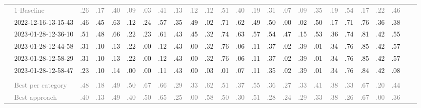 \begin{table*}
\begin{tabular}{@{}ll@{\hspace{10pt}}c@{\hspace{5pt}}cccccccccccccccccccccc@{}}
& \textcolor{gray}{1-Baseline} & \textcolor{gray}{.26} & \textcolor{gray}{.17} & \textcolor{gray}{.40} & \textcolor{gray}{.09} & \textcolor{gray}{.03} & \textcolor{gray}{.41} & \textcolor{gray}{.13} & \textcolor{gray}{.12} & \textcolor{gray}{.12} & \textcolor{gray}{.51} & \textcolor{gray}{.40} & \textcolor{gray}{.19} & \textcolor{gray}{.31} & \textcolor{gray}{.07} & \textcolor{gray}{.09} & \textcolor{gray}{.35} & \textcolor{gray}{.19} & \textcolor{gray}{.54} & \textcolor{gray}{.17} & \textcolor{gray}{.22} & \textcolor{gray}{.46} \\
& 2022-12-16-13-15-43 & .46 & .45 & .63 & .12 & .24 & .57 & .35 & .49 & .02 & .71 & .62 & .49 & .50 & .00 & .02 & .50 & .17 & .71 & .76 & .36 & .38 \\
& 2023-01-28-12-36-10 & .51 & .48 & .66 & .22 & .23 & .61 & .43 & .45 & .32 & .74 & .63 & .57 & .54 & .47 & .15 & .53 & .36 & .74 & .81 & .42 & .55 \\
& 2023-01-28-12-44-58 & .31 & .10 & .13 & .22 & .00 & .12 & .43 & .00 & .32 & .76 & .06 & .11 & .37 & .02 & .39 & .01 & .34 & .76 & .85 & .42 & .57 \\
& 2023-01-28-12-58-29 & .31 & .10 & .13 & .22 & .00 & .12 & .43 & .00 & .32 & .76 & .06 & .11 & .37 & .02 & .39 & .01 & .34 & .76 & .85 & .42 & .57 \\
& 2023-01-28-12-58-47 & .23 & .10 & .14 & .00 & .00 & .11 & .43 & .00 & .03 & .01 & .07 & .11 & .35 & .02 & .39 & .01 & .34 & .76 & .84 & .42 & .08 \\
\addlinespace
\multicolumn{2}{@{}l}{\emph{Nahj al-Balagha}} \\
& \textcolor{gray}{Best per category} & \textcolor{gray}{.48} & \textcolor{gray}{.18} & \textcolor{gray}{.49} & \textcolor{gray}{.50} & \textcolor{gray}{.67} & \textcolor{gray}{.66} & \textcolor{gray}{.29} & \textcolor{gray}{.33} & \textcolor{gray}{.62} & \textcolor{gray}{.51} & \textcolor{gray}{.37} & \textcolor{gray}{.55} & \textcolor{gray}{.36} & \textcolor{gray}{.27} & \textcolor{gray}{.33} & \textcolor{gray}{.41} & \textcolor{gray}{.38} & \textcolor{gray}{.33} & \textcolor{gray}{.67} & \textcolor{gray}{.20} & \textcolor{gray}{.44} \\
& \textcolor{gray}{Best approach} & \textcolor{gray}{.40} & \textcolor{gray}{.13} & \textcolor{gray}{.49} & \textcolor{gray}{.40} & \textcolor{gray}{.50} & \textcolor{gray}{.65} & \textcolor{gray}{.25} & \textcolor{gray}{.00} & \textcolor{gray}{.58} & \textcolor{gray}{.50} & \textcolor{gray}{.30} & \textcolor{gray}{.51} & \textcolor{gray}{.28} & \textcolor{gray}{.24} & \textcolor{gray}{.29} & \textcolor{gray}{.33} & \textcolor{gray}{.38} & \textcolor{gray}{.26} & \textcolor{gray}{.67} & \textcolor{gray}{.00} & \textcolor{gray}{.36} \\

\end{tabular}
\end{table*}

